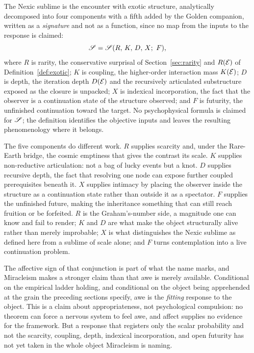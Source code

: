 \begin{definition}\label{def:sublime}
The Nexic sublime is the encounter with exotic structure, analytically
decomposed into four components with a fifth added by the Golden
companion, written as a \emph{signature} and not as a function, since
no map from the inputs to the response is claimed:
\[
\mathscr{S}=\mathscr{S}(R,\,K,\,D,\,X;\ F),
\]
where $R$ is rarity, the conservative surprisal of Section~\ref{sec:rarity}
and $R(\mathcal{E})$ of Definition~\ref{def:exotic}; $K$ is coupling, the higher-order interaction
mass $K(\mathcal{E})$; $D$ is depth, the iteration depth $D(\mathcal{E})$ and the
recursively articulated substructure exposed as the closure is unpacked;
$X$ is indexical incorporation, the fact that the observer is a
continuation state of the structure
observed; and $F$ is futurity, the unfinished continuation toward the
target. No psychophysical formula is claimed for $\mathscr{S}$; the definition
identifies the objective inputs and leaves the resulting phenomenology
where it belongs.
\end{definition}

The five components do different work. $R$ supplies scarcity and,
under the Rare-Earth bridge, the cosmic emptiness that gives the
contrast its scale. $K$ supplies non-reductive articulation: not a bag
of lucky events but a knot. $D$ supplies recursive depth, the fact that
resolving one node can expose further coupled prerequisites beneath it.
$X$ supplies intimacy by placing the observer inside the structure as a
continuation state rather than outside it as a spectator. $F$ supplies
the unfinished future, making the inheritance something that can still
reach fruition or be forfeited. $R$ is the Graham's-number side, a
magnitude one can know and fail to render; $K$ and $D$ are what make the
object structurally alive rather than merely improbable; $X$ is what
distinguishes the Nexic sublime as defined here from a sublime of scale
alone; and $F$ turns contemplation into a live continuation problem.

The affective sign of that conjunction is part of what the name marks,
and Miracleism makes a stronger claim than that awe is merely available.
Conditional on the empirical ladder holding, and conditional on the
object being apprehended at the grain the preceding sections specify,
awe is the \emph{fitting} response to the object. This is a claim about
appropriateness, not psychological compulsion: no theorem can force a
nervous system to feel awe, and affect supplies no evidence for the
framework. But a response that registers only the scalar probability
and not the scarcity, coupling, depth, indexical incorporation, and open
futurity has not yet taken in the whole object Miracleism is naming.

